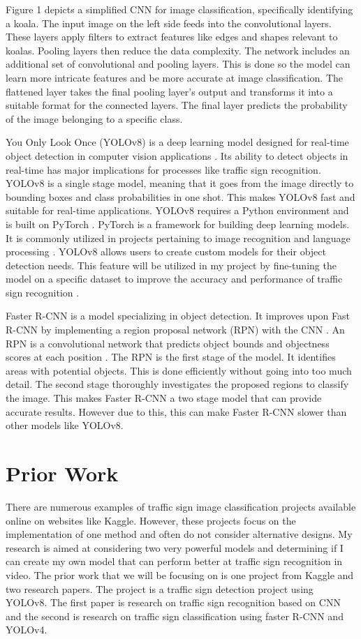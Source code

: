 \documentclass[10pt,twocolumn]{article}
\begin{document}
Figure 1 depicts a simplified CNN for image classification, specifically identifying a koala. The input image on the left side feeds into the convolutional layers. These layers apply filters to extract features like edges and shapes relevant to koalas. Pooling layers then reduce the data complexity. The network includes an additional set of convolutional and pooling layers. This is done so the model can learn more intricate features and be more accurate at image classification. The flattened layer takes the final pooling layer's output and transforms it into a suitable format for the connected layers. The final layer predicts the probability of the image belonging to a specific class. 


You Only Look Once (YOLOv8) is a deep learning model designed for real-time object detection in computer vision applications \textcite{keylabs}. Its ability to detect objects in real-time has major implications for processes like traffic sign recognition. YOLOv8 is a single stage model, meaning that it goes from the image directly to bounding boxes and class probabilities in one shot. This makes YOLOv8 fast and suitable for real-time applications. YOLOv8 requires a Python environment and is built on PyTorch \textcite{keylabs}. PyTorch is a framework for building deep learning models. It is commonly utilized in projects pertaining to image recognition and language processing \textcite{PyTorch}. YOLOv8 allows users to create custom models for their object detection needs. This feature will be utilized in my project by fine-tuning the model on a specific dataset to improve the accuracy and performance of traffic sign recognition \textcite{keylabs}.

Faster R-CNN is a model specializing in object detection. It improves upon Fast R-CNN by implementing a region proposal network (RPN) with the CNN \textcite{R-CNN}. An RPN is a convolutional network that predicts object bounds and objectness scores at each position \textcite{RPN}. The RPN is the first stage of the model. It identifies areas with potential objects. This is done efficiently without going into too much detail. The second stage thoroughly investigates the proposed regions to classify the image. This makes Faster R-CNN a two stage model that can provide accurate results. However due to this, this can make Faster R-CNN slower than other models like YOLOv8.

\section{Prior Work}
There are numerous examples of traffic sign image classification projects available online on websites like Kaggle. However, these projects focus on the implementation of one method and often do not consider alternative designs. My research is aimed at considering two very powerful models and determining if I can create my own model that can perform better at traffic sign recognition in video. The prior work that we will be focusing on is one project from Kaggle and two research papers. The project is a traffic sign detection project using YOLOv8. The first paper is research on traffic sign recognition based on CNN and the second is research on traffic sign classification using faster R-CNN and YOLOv4.  
\end{document}
